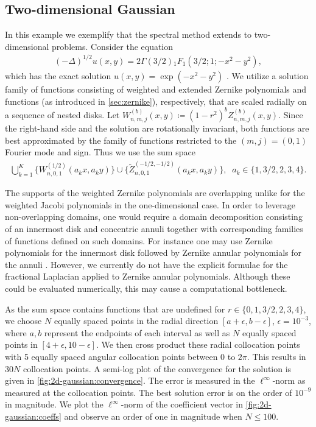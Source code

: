\documentclass[10pt,a4paper]{article}
\numberwithin{equation}{section}
\begin{document}
\subsection{Two-dimensional Gaussian}
\label{sec:2d-gaussian}

In this example we exemplify that the spectral method extends to two-dimensional problems. Consider the equation
\begin{align}
(-\Delta)^{1/2} u(x,y) = 2 \Gamma(3/2) {_1}F_1(3/2;1;-x^2-y^2), \label{eq:2dgaussian}
\end{align}
which has the exact solution $u(x,y) = \exp(-x^2-y^2)$ \cite[Prop.~4.2]{Sheng2020}. We utilize a solution family of functions consisting of weighted and extended Zernike polynomials and functions (as introduced in \cref{sec:zernike}), respectively, that are scaled radially on a sequence of nested disks. Let $W^{(b)}_{n,m,j}(x,y) \coloneqq (1-r^2)^b Z^{(b)}_{n,m,j}(x,y)$. Since the right-hand side and the solution are rotationally invariant, both functions are best approximated by the family of functions restricted to the $(m,j) = (0,1)$ Fourier mode and sign. Thus we use the sum space
\begin{align}
\bigcup_{k=1}^K \{ W^{(1/2)}_{n,0,1}(a_k x, a_k y) \} \cup  \{ \tilde{Z}^{(-1/2,-1/2)}_{n,0,1}(a_k x, a_k y) \}, \;\; a_k  \in \{1, 3/2, 2, 3, 4\}. 
\end{align}


The supports of the weighted Zernike polynomials are overlapping unlike for the weighted Jacobi polynomials in the one-dimensional case. In order to leverage non-overlapping domains, one would require a domain decomposition consisting of an innermost disk and concentric annuli together with corresponding families of functions defined on such domains. For instance one may use Zernike polynomials for the innermost disk followed by Zernike annular polynomials for the annuli \cite{papadopoulos2024}. However, we currently do not have the explicit formulae for the fractional Laplacian applied to Zernike annular polynomials. Although these could be evaluated numerically, this may cause a computational bottleneck.


As the sum space contains functions that are undefined for $r \in \{0, 1, 3/2, 2, 3, 4\}$, we choose $N$ equally spaced points in the radial direction $[a+\epsilon, b-\epsilon]$, $\epsilon = 10^{-3}$, where $a, b$ represent the endpoints of each interval as well as $N$ equally spaced points in $[4+\epsilon,10-\epsilon]$. We then cross product these radial collocation points with 5 equally spaced angular collocation points between 0 to $2\pi$. This results in $30N$  collocation points. A semi-log plot of the convergence for the solution is given in \cref{fig:2d-gaussian:convergence}. The error is measured in the $\ell^\infty$-norm as measured at the collocation points. The best solution error is on the order of $10^{-9}$ in magnitude. We plot the $\ell^\infty$-norm of the coefficient vector in \cref{fig:2d-gaussian:coeffs} and observe an order of one in magnitude when $N \leq 100$. 
\end{document}
